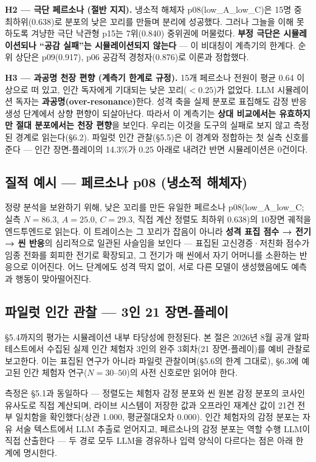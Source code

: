 \documentclass[11pt, a4paper]{article}
\begin{document}
\textbf{H2 --- 극단 페르소나 (절반 지지).} 냉소적 해체자 p08(low\_A\_low\_C)은 15명 중 최하위(0.638)로 분포의 낮은 꼬리를 만들며 분리에 성공했다. 그러나 그늘을 이해 못 하도록 겨냥한 극단 낙관형 p15는 7위(0.840) 중위권에 머물렀다. \textbf{부정 극단은 시뮬레이션되나 ``공감 실패''는 시뮬레이션되지 않는다} --- 이 비대칭이 계측기의 한계다. 순위 상단은 p09(0.917), p06 공감적 경청자(0.876)로 이론과 정합했다.

\textbf{H3 --- 과공명 천장 편향 (계측기 한계로 규정).} 15개 페르소나 전원이 평균 0.64 이상으로 떠 있고, 인간 독자에게 기대되는 낮은 꼬리($< 0.25$)가 없었다. LLM 시뮬레이션 독자는 \textbf{과공명(over-resonance)}한다. 성격 축을 실제 분포로 표집해도 감정 반응 생성 단계에서 상향 편향이 되살아난다. 따라서 이 계측기는 \textbf{상대 비교에서는 유효하지만 절대 분포에서는 천장 편향}을 보인다. 우리는 이것을 도구의 실패로 보지 않고 측정된 경계로 읽는다(\S6.2). 파일럿 인간 관찰(\S5.5)은 이 경계와 정합하는 첫 실측 신호를 준다 --- 인간 장면-플레이의 14.3\%가 0.25 아래로 내려간 반면 시뮬레이션은 0건이다.

\subsection{질적 예시 --- 페르소나 p08 (냉소적 해체자)}
정량 분석을 보완하기 위해, 낮은 꼬리를 만든 유일한 페르소나 p08(low\_A\_low\_C; 실측 $N=86.3$, $A=25.0$, $C=29.3$, 직접 계산 정렬도 최하위 0.638)의 10장면 궤적을 엔드투엔드로 읽는다. 이 트레이스는 그 꼬리가 잡음이 아니라 \textbf{성격 표집 점수 → 전기 → 씬 반응}의 심리적으로 일관된 사슬임을 보인다 --- 표집된 고신경증·저친화 점수가 임종 전화를 회피한 전기로 확장되고, 그 전기가 매 씬에서 자기 어머니를 소환하는 반응으로 이어진다. 어느 단계에도 성격 딱지 없이, 서로 다른 모델이 생성했음에도 예측과 행동이 맞아떨어진다.

\subsection{파일럿 인간 관찰 --- 3인 21 장면-플레이}

\S5.4까지의 평가는 시뮬레이션 내부 타당성에 한정된다. 본 절은 2026년 8월 공개 알파 테스트에서 수집된 실제 인간 체험자 3인의 완주 3회차(21 장면-플레이)를 예비 관찰로 보고한다. 이는 표집된 연구가 아니라 파일럿 관찰이며(\S5.6의 한계 그대로), \S6.3에 예고된 인간 체험자 연구($N=30$--$50$)의 사전 신호로만 읽어야 한다.

측정은 \S5.1과 동일하다 --- 정렬도는 체험자 감정 분포와 씬 원본 감정 분포의 코사인 유사도로 직접 계산되며, 라이브 시스템이 저장한 값과 오프라인 재계산 값이 21건 전부 일치함을 확인했다(상관 1.000, 평균절대오차 0.000). 인간 체험자의 감정 분포는 자유 서술 텍스트에서 LLM 추출로 얻어지고, 페르소나의 감정 분포는 역할 수행 LLM이 직접 산출한다 --- 두 경로 모두 LLM을 경유하나 입력 양식이 다르다는 점은 아래 한계에 명시한다.
\end{document}
